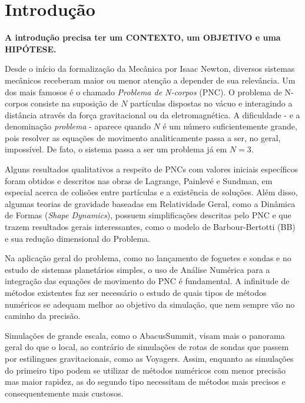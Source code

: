 
\chapter{Introdução}
\label{cap:introducao}

\textbf{
  A introdução precisa ter um CONTEXTO, um OBJETIVO e uma HIPÓTESE.
}

Desde o início da formalização da Mecânica por Isaac Newton, diversos sistemas mecânicos
receberam maior ou menor atenção a depender de sua relevância. Um dos mais famosos é o
chamado \textit{Problema de N-corpos} (PNC). O problema de N-corpos consiste na suposição de $N$
partículas dispostas no vácuo e interagindo a distância através da força gravitacional ou
da eletromagnética. A dificuldade - e a denominação \textit{problema} - aparece quando $N$ é um
número suficientemente grande, pois resolver as equações de movimento analiticamente passa
a ser, no geral, impossível. De fato, o sistema passa a ser um problema já em $N = 3$.

Alguns resultados qualitativos a respeito de PNCs com valores iniciais específicos foram obtidos e
descritos nas obras de Lagrange, Painlevé e Sundman, em especial acerca de colisões entre
partículas e a existência de soluções. Além disso, algumas teorias de gravidade baseadas em
Relatividade Geral, como a Dinâmica de Formas (\textit{Shape Dynamics}), possuem simplificações
descritas pelo PNC e que trazem resultados gerais interessantes, como o modelo de 
Barbour-Bertotti (BB) e sua redução dimensional do Problema.

Na aplicação geral do problema, como no lançamento de foguetes e sondas e no estudo de sistemas
planetários simples, o uso de Análise Numérica para a integração das equações de movimento
do PNC é fundamental. A infinitude de métodos existentes faz ser necessário o estudo de
quais tipos de métodos numéricos se adequam melhor ao objetivo da simulação, que nem sempre
vão no caminho da precisão.

Simulações de grande escala, como o AbacusSummit, visam mais o panorama geral do que o local,
ao contrário de simulações de rotas de sondas que passem por estilingues gravitacionais, como
as Voyagers. Assim, enquanto as simulações do primeiro tipo podem se utilizar de métodos
numéricos com menor precisão mas maior rapidez, as do segundo tipo necessitam de métodos mais
precisos e consequentemente mais custosos.

